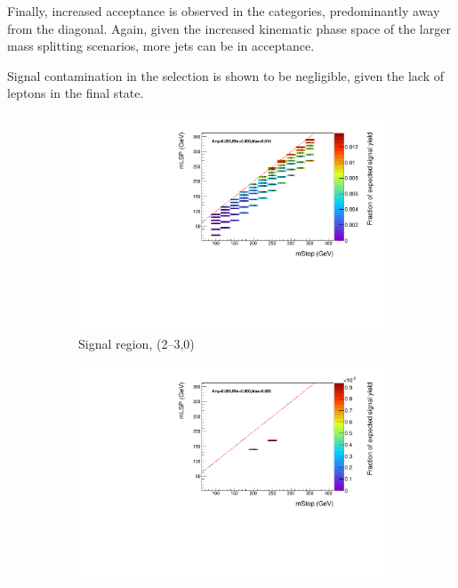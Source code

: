 Finally, increased acceptance is observed in the \njhigh categories, 
predominantly away from the diagonal. Again, given the increased kinematic phase
space of the larger mass splitting scenarios, more jets can be in 
acceptance.


Signal contamination in the \mj selection is shown to be negligible, given the 
lack of leptons in the final state.


\begin{figure}[ht!]
  \centering
  \begin{subfigure}[b]{0.47\textwidth}
    \includegraphics[width=\textwidth]{Figs/sms/t2cc/v37/effs/T2cc_had_eff_maps_eq0b_le3j_SITV.pdf}
    \caption{Signal region, (2--3,0)}
    \label{fig:t2cc_sig_eff_le3j_0b}
  \end{subfigure}
  \begin{subfigure}[b]{0.47\textwidth}
    \includegraphics[width=\textwidth]{Figs/sms/t2cc/v37/effs/T2cc_muon_eff_maps_eq0b_le3j_SITV.pdf}

\end{subfigure}
\end{figure}
